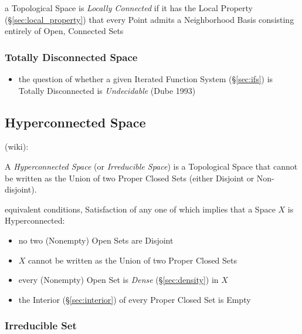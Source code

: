 a Topological Space is \emph{Locally Connected} if it has the Local Property
(\S\ref{sec:local_property}) that every Point admits a Neighborhood Basis
consisting entirely of Open, Connected Sets



\subsubsection{Totally Disconnected Space}\label{sec:totally_disconnected}

\begin{itemize}
  \item the question of whether a given Iterated Function System
    (\S\ref{sec:ifs}) is Totally Disconnected is \emph{Undecidable} (Dube 1993)
\end{itemize}



\subsection{Hyperconnected Space}\label{sec:hyperconnected_space}

(wiki):

A \emph{Hyperconnected Space} (or \emph{Irreducible Space}) is a Topological
Space that cannot be written as the Union of two Proper Closed Sets (either
Disjoint or Non-disjoint).

equivalent conditions, Satisfaction of any one of which implies that a Space
$X$ is Hyperconnected:
\begin{itemize}
  \item no two (Nonempty) Open Sets are Disjoint
  \item $X$ cannot be written as the Union of two Proper Closed Sets
  \item every (Nonempty) Open Set is \emph{Dense} (\S\ref{sec:density}) in $X$
  \item the Interior (\S\ref{sec:interior}) of every Proper Closed Set is Empty
\end{itemize}



\subsubsection{Irreducible Set}\label{sec:irreducible_set}

